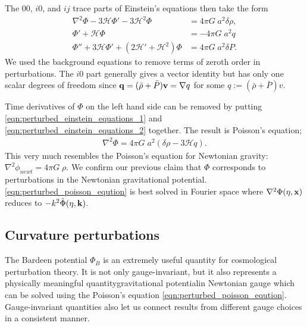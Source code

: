 The $00$, $i0$, and $ij$ trace parts of Einstein's equations then take the form
\begin{align}
	\nabla^2 \Phi - 3 \mathcal{H} \Phi' - 3\mathcal{H}^2 \Phi &= 4\pi G \; a^2 \delta\rho, \label{eqn:perturbed_einstein_equations_1}\\
	\Phi' + \mathcal{H} \Phi &= -4\pi G \; a^2 q \label{eqn:perturbed_einstein_equations_2}\\
	\Phi'' + 3\mathcal{H} \Phi' + (2\mathcal{H}' + \mathcal{H}^2) \Phi &= 4\pi G \; a^2 \delta P. \label{eqn:perturbed_einstein_equations_3}
\end{align}
We used the background equations to remove terms of zeroth order in perturbations. The $i0$ part generally gives a vector identity but has only one scalar degrees of freedom since $\mathbf{q}=(\bar{\rho}+\bar{P})\mathbf{v} = \nabla q$ for some $q := (\bar{\rho}+\bar{P}) v$.

Time derivatives of $\Phi$ on the left hand side can be removed by putting \eqref{eqn:perturbed_einstein_equations_1} and \eqref{eqn:perturbed_einstein_equations_2} together. The result is Poisson's equation;
\begin{align}
	\nabla^2 \Phi = 4\pi G \; a^2 (\delta\rho - 3\mathcal{H}q). \label{eqn:perturbed_poisson_eqution}
\end{align}
This very much resembles the Poisson's equation for Newtonian gravity: $\nabla^2 \phi_{newt} = 4\pi G \; \rho$. We confirm our previous claim that $\Phi$ corresponds to perturbations in the Newtonian gravitational potential. \eqref{eqn:perturbed_poisson_eqution} is best solved in Fourier space where $\nabla^2\Phi(\eta,\mathbf{x})$ reduces to $-k^2 \tilde{\Phi}(\eta,\mathbf{k})$.


\subsection{Curvature perturbations}

The Bardeen potential $\Phi_B$ is an extremely useful quantity for cosmological perturbation theory. It is not only gauge-invariant, but it also represents a physically meaningful quantity\textemdash gravitational potential\textemdash in Newtonian gauge which can be solved using the Poisson's equation \eqref{eqn:perturbed_poisson_eqution}. Gauge-invariant quantities also let us connect results from different gauge choices in a consistent manner.

